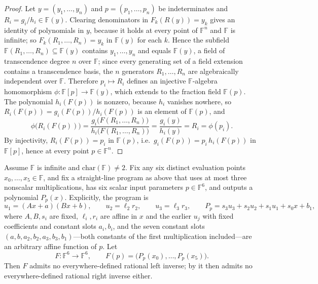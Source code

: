 \begin{proof}
Let $y=(y_1,\dots,y_n)$ and $p=(p_1,\dots,p_n)$ be indeterminates and $R_i=g_i/h_i\in\mathbb{F}(y)$.
Clearing denominators in $F_k(R(y))=y_k$ gives an identity of polynomials in $y$, because it holds at every point of $\mathbb{F}^n$ and $\mathbb{F}$ is infinite; so $F_k(R_1,\dots,R_n)=y_k$ in $\mathbb{F}(y)$ for each $k$.
Hence the subfield $\mathbb{F}(R_1,\dots,R_n)\subseteq\mathbb{F}(y)$ contains $y_1,\dots,y_n$ and equals $\mathbb{F}(y)$, a field of transcendence degree $n$ over $\mathbb{F}$; since every generating set of a field extension contains a transcendence basis, the $n$ generators $R_1,\dots,R_n$ are algebraically independent over $\mathbb{F}$.
Therefore $p_i\mapsto R_i$ defines an injective $\mathbb{F}$-algebra homomorphism $\phi\colon\mathbb{F}[p]\to\mathbb{F}(y)$, which extends to the fraction field $\mathbb{F}(p)$.
The polynomial $h_i(F(p))$ is nonzero, because $h_i$ vanishes nowhere, so $R_i(F(p))=g_i(F(p))/h_i(F(p))$ is an element of $\mathbb{F}(p)$, and
\[
   \phi\bigl(R_i(F(p))\bigr)
   =\frac{g_i\bigl(F(R_1,\dots,R_n)\bigr)}{h_i\bigl(F(R_1,\dots,R_n)\bigr)}
   =\frac{g_i(y)}{h_i(y)}=R_i=\phi(p_i).
\]
By injectivity, $R_i(F(p))=p_i$ in $\mathbb{F}(p)$, i.e.\ $g_i(F(p))=p_i\,h_i(F(p))$ in $\mathbb{F}[p]$, hence at every point $p\in\mathbb{F}^n$.
\end{proof}



\begin{lemma}[$6$ parameters]
\label{lem:six-params}
Assume $\mathbb{F}$ is infinite and $\mathrm{char}(\mathbb{F})\neq 2$.
Fix any six distinct evaluation points $x_0,\dots,x_5\in\mathbb{F}$, and fix a straight-line program as above that uses at most three nonscalar multiplications, has six scalar input parameters $p\in\mathbb{F}^6$, and outputs a polynomial $P_p(x)$.
Explicitly, the program is
\[
   u_1=(Ax+a)(Bx+b),\qquad u_2=\ell_2r_2,\qquad u_3=\ell_3r_3,\qquad
   P_p=s_3u_3+s_2u_2+s_1u_1+s_0x+b_1,
\]
where $A,B,s_i$ are fixed, $\ell_i,r_i$ are affine in $x$ and the earlier $u_j$ with fixed coefficients and constant slots $a_i,b_i$, and the seven constant slots $(a,b,a_2,b_2,a_3,b_3,b_1)$---both constants of the first multiplication included---are an arbitrary affine function of $p$.
Let
\[
   F:\mathbb{F}^6\to\mathbb{F}^6,\qquad
   F(p) = \bigl(P_p(x_0),\dots,P_p(x_5)\bigr).
\]
Then $F$ admits no everywhere-defined rational left inverse; by  it then admits no everywhere-defined rational right inverse either.
\end{lemma}


